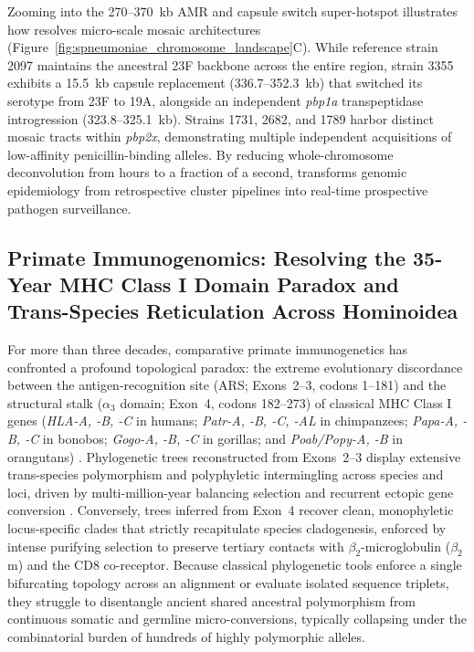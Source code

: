 Zooming into the 270--370~kb AMR and capsule switch super-hotspot illustrates how \RhizAeon resolves micro-scale mosaic architectures (Figure~\ref{fig:spneumoniae_chromosome_landscape}C).
While reference strain 2097 maintains the ancestral 23F backbone across the entire region, strain 3355 exhibits a 15.5~kb capsule replacement (336.7--352.3~kb) that switched its serotype from 23F to 19A, alongside an independent \textit{pbp1a} transpeptidase introgression (323.8--325.1~kb).
Strains 1731, 2682, and 1789 harbor distinct mosaic tracts within \textit{pbp2x}, demonstrating multiple independent acquisitions of low-affinity penicillin-binding alleles.
By reducing whole-chromosome deconvolution from hours to a fraction of a second, \RhizAeon transforms genomic epidemiology from retrospective cluster pipelines into real-time prospective pathogen surveillance.

\subsection{Primate Immunogenomics: Resolving the 35-Year MHC Class I Domain Paradox and Trans-Species Reticulation Across Hominoidea}
\label{subsec:primate_mhc_class1}

For more than three decades, comparative primate immunogenetics has confronted a profound topological paradox: the extreme evolutionary discordance between the antigen-recognition site (ARS; Exons~2--3, codons 1--181) and the structural stalk ($\alpha_3$ domain; Exon~4, codons 182--273) of classical MHC Class I genes (\textit{HLA-A, -B, -C} in humans; \textit{Patr-A, -B, -C, -AL} in chimpanzees; \textit{Papa-A, -B, -C} in bonobos; \textit{Gogo-A, -B, -C} in gorillas; and \textit{Poab/Popy-A, -B} in orangutans) \citep{parham1995origins,adams2001species,fortier2025ancient}.
Phylogenetic trees reconstructed from Exons~2--3 display extensive trans-species polymorphism and polyphyletic intermingling across species and loci, driven by multi-million-year balancing selection and recurrent ectopic gene conversion \citep{parham1995origins,adams2001species,fortier2025ancient}.
Conversely, trees inferred from Exon~4 recover clean, monophyletic locus-specific clades that strictly recapitulate species cladogenesis, enforced by intense purifying selection to preserve tertiary contacts with $\beta_2$-microglobulin ($\beta_2$m) and the CD8 co-receptor.
Because classical phylogenetic tools enforce a single bifurcating topology across an alignment or evaluate isolated sequence triplets, they struggle to disentangle ancient shared ancestral polymorphism from continuous somatic and germline micro-conversions, typically collapsing under the combinatorial burden of hundreds of highly polymorphic alleles.

